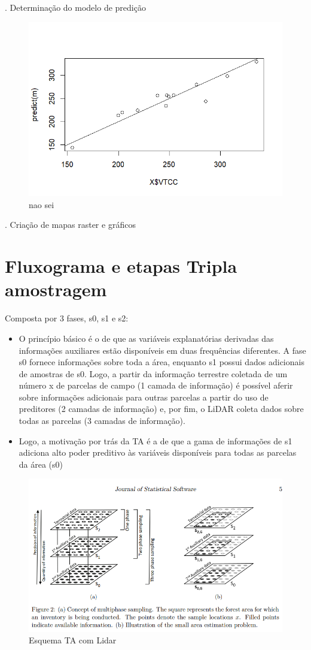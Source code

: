 \documentclass[
]{article}
\begin{document}
. Determinação do modelo de predição

\begin{figure}

{\centering \includegraphics[width=0.5\linewidth]{IMAGES/analise-de-regressao} 

}

\caption{nao sei}\label{fig:unnamed-chunk-20}
\end{figure}

. Criação de mapas raster e gráficos \newpage

\section{Fluxograma e etapas Tripla
amostragem}\label{fluxograma-e-etapas-tripla-amostragem}

Composta por 3 fases, s0, s1 e s2:

\begin{itemize}
\item
  O princípio básico é o de que as variáveis explanatórias derivadas das
  informações auxiliares estão disponíveis em duas frequências
  diferentes. A fase s0 fornece informações sobre toda a área, enquanto
  s1 possui dados adicionais de amostras de s0. Logo, a partir da
  informação terrestre coletada de um número x de parcelas de campo (1
  camada de informação) é possível aferir sobre informações adicionais
  para outras parcelas a partir do uso de preditores (2 camadas de
  informação) e, por fim, o LiDAR coleta dados sobre todas as parcelas
  (3 camadas de informação).
\item
  Logo, a motivação por trás da TA é a de que a gama de informações de
  s1 adiciona alto poder preditivo às variáveis disponíveis para todas
  as parcelas da área (s0)
\end{itemize}

\begin{figure}

{\centering \includegraphics[width=0.5\linewidth]{IMAGES/esquematizacao-TA} 

}

\caption{Esquema TA com Lidar}\label{fig:unnamed-chunk-21}
\end{figure}
\end{document}
